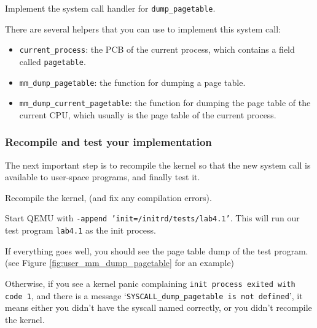 \begin{exercise}
    \item Implement the system call handler for \texttt{dump\_pagetable}.
\end{exercise}

There are several helpers that you can use to implement this system call:

\begin{itemize}
    \item \texttt{current\_process}: the PCB of the current process, which contains
          a field called \texttt{pagetable}.
    \item \texttt{mm\_dump\_pagetable}: the function for dumping a page table.
    \item \texttt{mm\_dump\_current\_pagetable}: the function for dumping the page
          table of the current CPU, which usually is the page table of the current
          process.
\end{itemize}

\subsubsection{Recompile and test your implementation}

The next important step is to recompile the kernel so that the new system call
is available to user-space programs, and finally test it.

\begin{exercise}
    \item Recompile the kernel, (and fix any compilation errors).
    \item Start QEMU with \texttt{-append 'init=/initrd/tests/lab4.1'}.
    This will run our test program \texttt{lab4.1} as the init process.
\end{exercise}

If everything goes well, you should see the page table dump of the test program.
(see Figure \ref{fig:user_mm_dump_pagetable} for an example)

Otherwise, if you see a kernel panic complaining \texttt{init process exited with code 1},
and there is a message `\texttt{SYSCALL\_dump\_pagetable is not defined}', it means
either you didn't have the syscall named correctly, or you didn't recompile the kernel.

